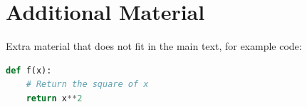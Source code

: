 \chapter{Additional Material}
\label{app:additional}

Extra material that does not fit in the main text, for example code:

\begin{lstlisting}[language=Python]
def f(x):
    # Return the square of x
    return x**2
\end{lstlisting}
